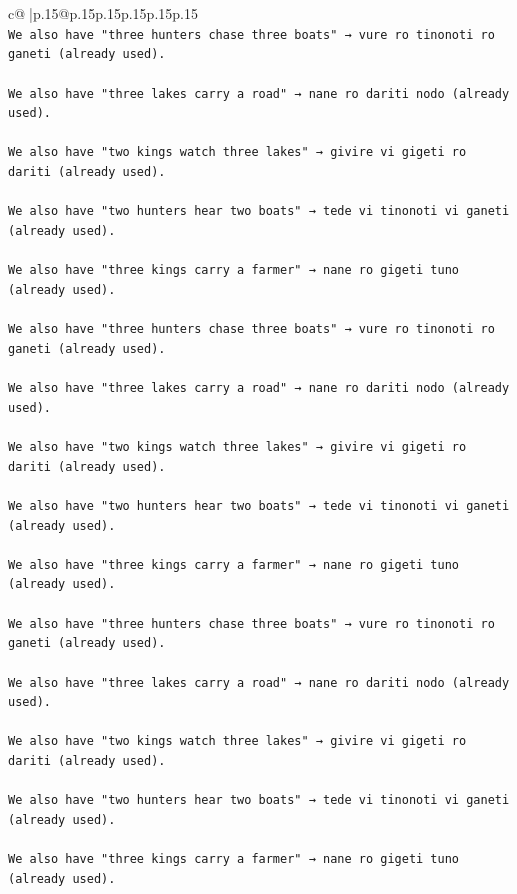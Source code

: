 \documentclass{article}
\begin{document}
{\begin{supertabular}{c@{$\;$}|p{.15\linewidth}@{}p{.15\linewidth}p{.15\linewidth}p{.15\linewidth}p{.15\linewidth}p{.15\linewidth}}
{{{\\ 
\texttt{We also have "three hunters chase three boats" → vure ro tinonoti ro ganeti (already used).} \\
\\ 
\texttt{We also have "three lakes carry a road" → nane ro dariti nodo (already used).} \\
\\ 
\texttt{We also have "two kings watch three lakes" → givire vi gigeti ro dariti (already used).} \\
\\ 
\texttt{We also have "two hunters hear two boats" → tede vi tinonoti vi ganeti (already used).} \\
\\ 
\texttt{We also have "three kings carry a farmer" → nane ro gigeti tuno (already used).} \\
\\ 
\texttt{We also have "three hunters chase three boats" → vure ro tinonoti ro ganeti (already used).} \\
\\ 
\texttt{We also have "three lakes carry a road" → nane ro dariti nodo (already used).} \\
\\ 
\texttt{We also have "two kings watch three lakes" → givire vi gigeti ro dariti (already used).} \\
\\ 
\texttt{We also have "two hunters hear two boats" → tede vi tinonoti vi ganeti (already used).} \\
\\ 
\texttt{We also have "three kings carry a farmer" → nane ro gigeti tuno (already used).} \\
\\ 
\texttt{We also have "three hunters chase three boats" → vure ro tinonoti ro ganeti (already used).} \\
\\ 
\texttt{We also have "three lakes carry a road" → nane ro dariti nodo (already used).} \\
\\ 
\texttt{We also have "two kings watch three lakes" → givire vi gigeti ro dariti (already used).} \\
\\ 
\texttt{We also have "two hunters hear two boats" → tede vi tinonoti vi ganeti (already used).} \\
\\ 
\texttt{We also have "three kings carry a farmer" → nane ro gigeti tuno (already used).} \\
}}}
\end{supertabular}}
\end{document}
